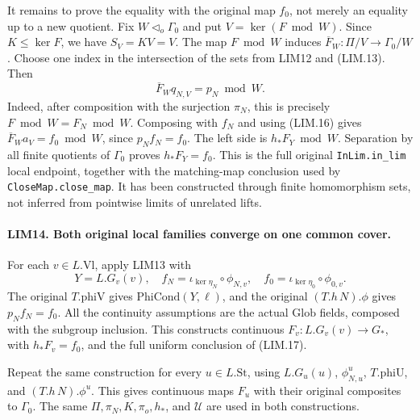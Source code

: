It remains to prove the equality with the original map \(f_0\),
not merely an equality up to a new quotient.
Fix \(W\triangleleft_o\Gamma_0\) and put
\(V=\ker(F\bmod W)\).  Since \(K\le\ker F\), we have
\(S_V=KV=V\).  The map \(F\bmod W\) induces
\(\overline F_W:\Pi/V\to\Gamma_0/W\).
Choose one index in the intersection of the sets from LIM12 and
(LIM.13).  Then
\[
 \overline F_Wq_{N,V}=p_N\bmod W.
\]
Indeed, after composition with the surjection \(\pi_N\), this is
precisely \(F\bmod W=F_N\bmod W\).
Composing with \(f_N\) and using (LIM.16) gives
\(\overline F_Wa_V=f_0\bmod W\), since \(p_Nf_N=f_0\).
The left side is \(h_*F_Y\bmod W\).
Separation by all finite quotients of \(\Gamma_0\) proves
\(h_*F_Y=f_0\).
This is the full original \texttt{InLim.in\_lim} local endpoint,
together with the matching-map conclusion used by
\texttt{CloseMap.close\_map}.  It has been constructed through
finite homomorphism sets, not inferred from pointwise limits of
unrelated lifts.

\paragraph{LIM14. Both original local families converge on one common cover.}
\label{claim:LIM14}
For each \(v\in L.\mathrm{Vl}\), apply LIM13 with
\[
 Y=L.G_v(v),\quad
 f_N=\iota_{\ker\eta_N}\circ\phi_{N,v},\quad
 f_0=\iota_{\ker\eta_0}\circ\phi_{0,v}.
 \tag{LIM.19}
\]
The original \(T.\mathrm{phiV}\) gives \(\mathrm{PhiCond}(Y,\ell)\),
and the original \((T.h\,N).\phi\) gives \(p_Nf_N=f_0\).
All the continuity assumptions are the actual \(\mathrm{Glob}\)
fields, composed with the subgroup inclusion.
This constructs continuous \(F_v:L.G_v(v)\to G_*\), with
\(h_*F_v=f_0\), and the full uniform conclusion of (LIM.17).

Repeat the same construction for every \(u\in L.\mathrm{St}\),
using \(L.G_u(u)\), \(\phi^u_{N,u}\), \(T.\mathrm{phiU}\),
and \((T.h\,N).\phi^u\).  This gives continuous maps \(F_u\)
with their original composites to \(\Gamma_0\).
The same \(\Pi,\pi_N,K,\pi_o,h_*\), and \(\mathcal U\) are used
in both constructions.

